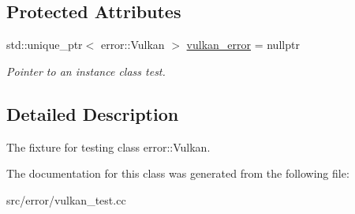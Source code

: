 \subsection*{Protected Attributes}
\begin{DoxyCompactItemize}
\item 
\hypertarget{class_error_vulkan_test_a2413e0ba8b4ef1f1d872554142f24fab}{}\label{class_error_vulkan_test_a2413e0ba8b4ef1f1d872554142f24fab} 
std\+::unique\+\_\+ptr$<$ error\+::\+Vulkan $>$ \hyperlink{class_error_vulkan_test_a2413e0ba8b4ef1f1d872554142f24fab}{vulkan\+\_\+error} = nullptr
\begin{DoxyCompactList}\small\item\em Pointer to an instance class test. \end{DoxyCompactList}\end{DoxyCompactItemize}


\subsection{Detailed Description}
The fixture for testing class error\+::\+Vulkan. 

The documentation for this class was generated from the following file\+:\begin{DoxyCompactItemize}
\item 
src/error/vulkan\+\_\+test.\+cc\end{DoxyCompactItemize}
